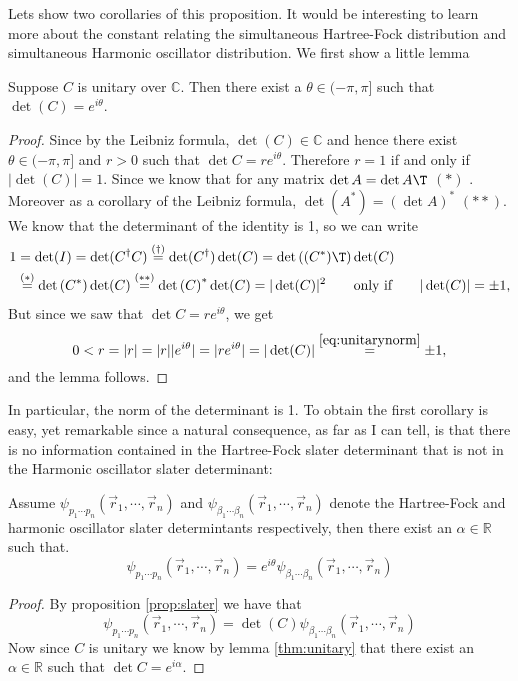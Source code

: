 \documentclass[11pt,english,a4paper]{article}
\begin{document}
Lets show two corollaries of this proposition. It would be interesting to learn more about the constant relating the simultaneous Hartree-Fock distribution and simultaneous Harmonic oscillator distribution. We first show a little lemma
\begin{lemma}
Suppose $C$ is unitary over $\mathbb{C}$. Then there exist a $\theta \in (-\pi,\pi]$ such that $\det(C) = e^{ i \theta}$. \label{thm:unitary}
\end{lemma}
\begin{proof}
Since by the Leibniz formula, $\det (C) \in \mathbb{C}$ and hence there exist $\theta \in (-\pi,\pi]$ and $r>0$ such that $\det C = r e^{ i \theta}$. Therefore $r = 1$ if and only if $|\det(C)| = 1$. Since we know that for any matrix $ \det A = \det A\T $ $(*)$ \parencite[172]{lay_linear_2012}. Moreover as a corollary of the Leibniz formula, $\det (A^*) = (\det A)^*$ $(**)$. We know that the determinant of the identity is 1, so we can write
\begin{align}
1 &= \det(I) = \det(C^\dagger C) \stackrel{(\dagger)}{=} \det(C^\dagger)\det( C) = \det\left( (C^*)\T \right) \det (C) \nonumber \\
&\stackrel{(*)}{=} \det\left( C^* \right) \det (C) \stackrel{(**)}{=}\det\left( C \right)^* \det (C) = |\det (C)|^2 \qquad \text{only if} \qquad  |\det(C)| = \pm 1, \label{eq:unitarynorm}
\end{align}
But since we saw that $\det C = r e^{ i \theta}$, we get
\[
0<r = |r| = |r| |e^{ i \theta}| = |r e^{ i \theta}| = |\det (C)| \stackrel{\eqref{eq:unitarynorm} }{=} \pm 1,
\]
and the lemma follows.
\end{proof}
In particular, the norm of the determinant is 1. To obtain the first corollary is easy, yet remarkable since a natural consequence, as far as I can tell, is that there is no information contained in the Hartree-Fock slater determinant that is not in the Harmonic oscillator slater determinant:
\begin{corollary}
Assume $\psi_{  p_1\cdots p_n}(\vec{r}_1,\cdots, \vec{r}_n)$ and $\psi_{  \beta_1\cdots \beta_n}(\vec{r}_1,\cdots, \vec{r}_n)$ denote the Hartree-Fock and harmonic oscillator slater determintants respectively, then there exist an $\alpha \in \mathbb{R}$ such that.
\[
\psi_{  p_1\cdots p_n}(\vec{r}_1,\cdots, \vec{r}_n) = e^{ i \theta}\psi_{  \beta_1\cdots \beta_n}(\vec{r}_1,\cdots, \vec{r}_n) 
\] \label{cor:relation}
\end{corollary}
\begin{proof}
By proposition \ref{prop:slater} we have that
\[
\psi_{  p_1\cdots p_n}(\vec{r}_1,\cdots, \vec{r}_n) = \det (C) \psi_{  \beta_1\cdots \beta_n}(\vec{r}_1,\cdots, \vec{r}_n) 
\]
Now since $C$ is unitary we know by lemma \ref{thm:unitary} that there exist an $\alpha \in \mathbb{R}$ such that $\det C = e^{ i \alpha}$.
\end{proof}
\end{document}
